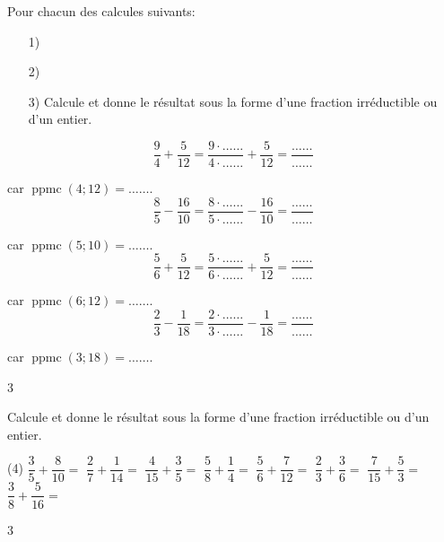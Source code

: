 \documentclass[a4paper,11pt]{report}
\begin{document}
\begin{exop}
{Pour chacun des calcules suivants:
	\begin{enumerate}
    \item[1)] 
    \item[2)] 
    \item[3)] {\text Calcule et donne le résultat sous la forme d'une fraction irréductible ou d'un entier.}
\end{enumerate}
\vspace{5pt}

\begin{tasks}
	\task \[\dfrac{9}{4}+\dfrac{5}{12}=\dfrac{9\cdot\ldots\ldots}{4\cdot\ldots\ldots}+\dfrac{5}{12}=\dfrac{\ldots\ldots}{\ldots\ldots}\]
		\vspace{1pt}

		car $\operatorname{ppmc}(4;12)=\ldots\ldots$. 
	\task \[\dfrac{8}{5}-\dfrac{16}{10}=\dfrac{8\cdot\ldots\ldots}{5\cdot\ldots\ldots}-\dfrac{16}{10}=\dfrac{\ldots\ldots}{\ldots\ldots}\]
		\vspace{1pt}

	car $\operatorname{ppmc}(5;10)=\ldots\ldots$.
	\task \[\dfrac{5}{6}+\dfrac{5}{12}=\dfrac{5\cdot\ldots\ldots}{6\cdot\ldots\ldots}+\dfrac{5}{12}=\dfrac{\ldots\ldots}{\ldots\ldots}\]
		\vspace{1pt}

		car $\operatorname{ppmc}(6;12)=\ldots\ldots$.
	\task \[\dfrac{2}{3}-\dfrac{1}{18}=\dfrac{2\cdot\ldots\ldots}{3\cdot\ldots\ldots}-\dfrac{1}{18}=\dfrac{\ldots\ldots}{\ldots\ldots}\]
		\vspace{1pt}

	car $\operatorname{ppmc}(3;18)=\ldots\ldots$.
\end{tasks}
}
{3}
\end{exop}

\begin{exo}
{Calcule et donne le résultat sous la forme d'une fraction irréductible ou d'un entier. 
\begin{tasks}(4)
\task $\dfrac{3}{5}+\dfrac{8}{10}=$
\task $\dfrac{2}{7}+\dfrac{1}{14}=$
\task $\dfrac{4}{15}+\dfrac{3}{5}=$
\task $\dfrac{5}{8}+\dfrac{1}{4}=$
\task $\dfrac{5}{6}+\dfrac{7}{12}=$
\task $\dfrac{2}{3}+\dfrac{3}{6}=$
\task $\dfrac{7}{15}+\dfrac{5}{3}=$
\task $\dfrac{3}{8}+\dfrac{5}{16}=$
\end{tasks}
\vspace{-0.2cm}
}{3}
\end{exo}
\end{document}
